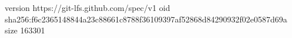version https://git-lfs.github.com/spec/v1
oid sha256:f6c2365148844a23c88661c8788f36109397af52868d84290932f02e0587d69a
size 163301
